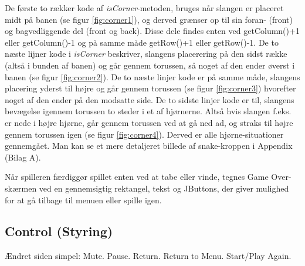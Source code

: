 De første to rækker kode af \textit{isCorner}-metoden, bruges når slangen er placeret midt på banen (se figur \ref{fig:corner1}), og derved grænser op til sin foran- (front) og bagvedliggende del (front og back). Disse dele findes enten ved getColumn()+1 eller getColumn()-1 og på samme måde getRow()+1 eller getRow()-1. De to næste lijner kode i \textit{isCorner} beskriver, slangens placerering på den sidst række (altså i bunden af banen) og går gennem torussen, så noget af den ender øverst i banen (se figur \ref{fig:corner2}).
De to næste linjer kode er på samme måde, slangens placering yderst til højre og går gennem torussen (se figur \ref{fig:corner3}) hvorefter noget af den ender på den modsatte side.
De to sidste linjer kode er til, slangens bevægelse igennem torussen to steder i et af hjørnerne. Altså hvis slangen f.eks. er nede i højre hjørne, går gennem torussen ved at gå ned ad, og straks til højre gennem torussen igen (se figur \ref{fig:corner4}).
Derved er alle hjørne-situationer gennemgået.
Man kan se et mere detaljeret billede af snake-kroppen i Appendix (Bilag A).
\begin{figure}[h]
	\centering
	\graphicspath{ {pics/} }
	\caption{}
	\hspace{0.05\textwidth}
	\hspace{0.05\textwidth}
	\hspace{0.05\textwidth}
\end{figure}

Når spilleren færdiggør spillet enten ved at tabe eller vinde, tegnes Game Over-skærmen ved en gennemsigtig rektangel, tekst og JButtons, der giver mulighed for at gå tilbage til menuen eller spille igen.

\subsection{Control (Styring)}
Ændret siden simpel: Mute. Pause. Return. Return to Menu. Start/Play Again.
\linebreak

